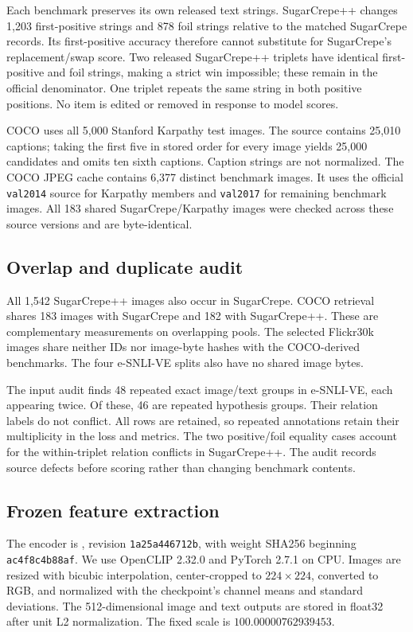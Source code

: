 Each benchmark preserves its own released text strings. SugarCrepe++ changes 1,203 first-positive strings and 878 foil strings relative to the matched SugarCrepe records. Its first-positive accuracy therefore cannot substitute for SugarCrepe's replacement/swap score. Two released SugarCrepe++ triplets have identical first-positive and foil strings, making a strict win impossible; these remain in the official denominator. One triplet repeats the same string in both positive positions. No item is edited or removed in response to model scores.

COCO uses all 5,000 Stanford Karpathy test images. The source contains 25,010 captions; taking the first five in stored order for every image yields 25,000 candidates and omits ten sixth captions. Caption strings are not normalized. The COCO JPEG cache contains 6,377 distinct benchmark images. It uses the official \texttt{val2014} source for Karpathy members and \texttt{val2017} for remaining benchmark images. All 183 shared SugarCrepe/Karpathy images were checked across these source versions and are byte-identical.

\subsection{Overlap and duplicate audit}
All 1,542 SugarCrepe++ images also occur in SugarCrepe. COCO retrieval shares 183 images with SugarCrepe and 182 with SugarCrepe++. These are complementary measurements on overlapping pools. The selected Flickr30k images share neither IDs nor image-byte hashes with the COCO-derived benchmarks. The four e-SNLI-VE splits also have no shared image bytes.

The input audit finds 48 repeated exact image/text groups in e-SNLI-VE, each appearing twice. Of these, 46 are repeated hypothesis groups. Their relation labels do not conflict. All rows are retained, so repeated annotations retain their multiplicity in the loss and metrics. The two positive/foil equality cases account for the within-triplet relation conflicts in SugarCrepe++. The audit records source defects before scoring rather than changing benchmark contents.

\subsection{Frozen feature extraction}
The encoder is , revision \texttt{1a25a446712b}, with weight SHA256 beginning \texttt{ac4f8c4b88af}. We use OpenCLIP 2.32.0 and PyTorch 2.7.1 on CPU. Images are resized with bicubic interpolation, center-cropped to $224\times224$, converted to RGB, and normalized with the checkpoint's channel means and standard deviations. The 512-dimensional image and text outputs are stored in float32 after unit L2 normalization. The fixed scale is $100.00000762939453$.

